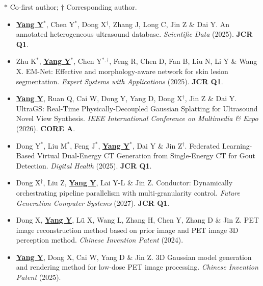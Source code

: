{\footnotesize $*$ Co-first author; $\dagger$ Corresponding author.}
\begin{itemize}[leftmargin=0pt,itemsep=2pt]
\item \underline{\textbf{Yang Y$^*$}}, Chen Y$^*$, Dong X$^\dagger$, Zhang J, Long C, Jin Z \& Dai Y. An annotated heterogeneous ultrasound database. \emph{Scientific Data} (2025). \textbf{JCR Q1}.
\item Zhu K$^*$, \underline{\textbf{Yang Y$^*$}}, Chen Y$^{*,\dagger}$, Feng R, Chen D, Fan B, Liu N, Li Y \& Wang X. EM-Net: Effective and morphology-aware network for skin lesion segmentation. \emph{Expert Systems with Applications} (2025). \textbf{JCR Q1}.
\item \underline{\textbf{Yang Y}}, Ruan Q, Cai W, Dong Y, Yang D, Dong X$^\dagger$, Jin Z \& Dai Y. UltraGS: Real-Time Physically-Decoupled Gaussian Splatting for Ultrasound Novel View Synthesis. \emph{IEEE International Conference on Multimedia \& Expo} (2026). \textbf{CORE A}.
\item Dong Y$^*$, Liu M$^*$, Feng J$^*$, \underline{\textbf{Yang Y$^*$}}, Dai Y \& Jin Z$^\dagger$. Federated Learning-Based Virtual Dual-Energy CT Generation from Single-Energy CT for Gout Detection. \emph{Digital Health} (2025). \textbf{JCR Q1}.
\item Dong X$^\dagger$, Liu Z, \underline{\textbf{Yang Y}}, Lai Y-L \& Jin Z. Conductor: Dynamically orchestrating pipeline parallelism with multi-granularity control. \emph{Future Generation Computer Systems} (2027). \textbf{JCR Q1}.
\item Dong X, \underline{\textbf{Yang Y}}, L\"u X, Wang L, Zhang H, Chen Y, Zhang D \& Jin Z. PET image reconstruction method based on prior image and PET image 3D perception method. \emph{Chinese Invention Patent} (2024).
\item \underline{\textbf{Yang Y}}, Dong X, Cai W, Yang D \& Jin Z. 3D Gaussian model generation and rendering method for low-dose PET image processing. \emph{Chinese Invention Patent} (2025).
\end{itemize}
